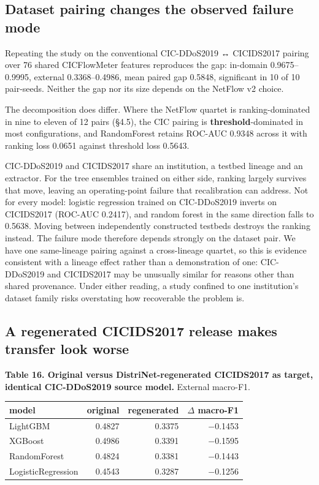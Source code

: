 \documentclass[11pt,a4paper]{article}
\begin{document}
\subsection{Dataset pairing changes the observed failure mode}

Repeating the study on the conventional CIC-DDoS2019 ↔ CICIDS2017 pairing over 76 shared CICFlowMeter features reproduces the gap: in-domain 0.9675--0.9995, external 0.3368--0.4986, mean paired gap 0.5848, significant in 10 of 10 pair-seeds. Neither the gap nor its size depends on the NetFlow v2 choice.

The decomposition does differ. Where the NetFlow quartet is ranking-dominated in nine to eleven of 12 pairs (§4.5), the CIC pairing is \textbf{threshold}-dominated in most configurations, and RandomForest retains ROC-AUC 0.9348 across it with ranking loss 0.0651 against threshold loss 0.5643.

CIC-DDoS2019 and CICIDS2017 share an institution, a testbed lineage and an extractor. For the tree ensembles trained on either side, ranking largely survives that move, leaving an operating-point failure that recalibration can address. Not for every model: logistic regression trained on CIC-DDoS2019 inverts on CICIDS2017 (ROC-AUC 0.2417), and random forest in the same direction falls to 0.5638. Moving between independently constructed testbeds destroys the ranking instead. The failure mode therefore depends strongly on the dataset pair. We have one same-lineage pairing against a cross-lineage quartet, so this is evidence consistent with a lineage effect rather than a demonstration of one: CIC-DDoS2019 and CICIDS2017 may be unusually similar for reasons other than shared provenance. Under either reading, a study confined to one institution's dataset family risks overstating how recoverable the problem is.

\subsection{A regenerated CICIDS2017 release makes transfer look worse}

\textbf{Table 16. Original versus DistriNet-regenerated CICIDS2017 as target, identical CIC-DDoS2019 source model.} External macro-F1.

\begin{table}[htbp]\centering\small
\begin{tabular}{lrrr}
\toprule
model & original & regenerated & $\Delta$ macro-F1 \\
\midrule
LightGBM & 0.4827 & 0.3375 & $-$0.1453 \\
XGBoost & 0.4986 & 0.3391 & $-$0.1595 \\
RandomForest & 0.4824 & 0.3381 & $-$0.1443 \\
LogisticRegression & 0.4543 & 0.3287 & $-$0.1256 \\
\bottomrule
\end{tabular}
\end{table}
\end{document}
